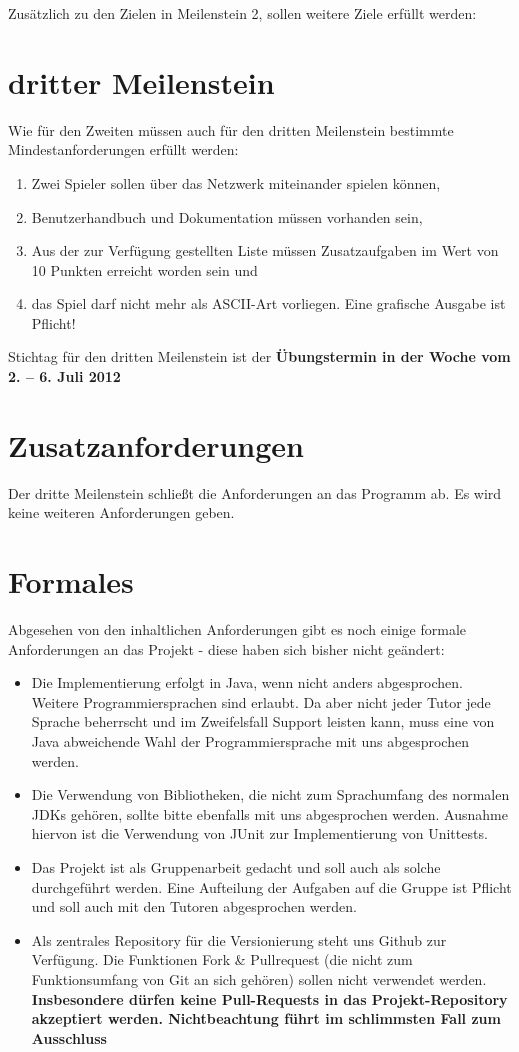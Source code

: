\documentclass{programmierpraktikum}
\subtitle{Bomberman}
\begin{document}
\maketitle
Zusätzlich zu den Zielen in Meilenstein 2, sollen weitere Ziele erfüllt werden:
%
\section{dritter Meilenstein}
Wie für den Zweiten müssen auch für den dritten Meilenstein bestimmte Mindestanforderungen erfüllt werden:
\begin{enumerate}
  \item Zwei Spieler sollen über das Netzwerk miteinander spielen können,
  \item Benutzerhandbuch und Dokumentation müssen vorhanden sein,
  \item Aus der zur Verfügung gestellten Liste müssen Zusatzaufgaben im Wert von 10 Punkten erreicht worden sein und
  \item das Spiel darf nicht mehr als ASCII-Art vorliegen. Eine grafische Ausgabe ist Pflicht!
\end{enumerate}
Stichtag für den dritten Meilenstein ist der \textbf{Übungstermin in der Woche vom 2. -- 6. Juli 2012}
\section{Zusatzanforderungen}
Der dritte Meilenstein schließt die Anforderungen an das Programm ab. Es wird keine weiteren Anforderungen geben.
\section{Formales}
Abgesehen von den inhaltlichen Anforderungen gibt es noch einige formale Anforderungen an das Projekt - diese haben sich bisher nicht geändert:
\begin{itemize}
  \item Die Implementierung erfolgt in Java, wenn nicht anders abgesprochen. Wei\-te\-re Pro\-gram\-mier\-sprachen sind erlaubt. Da aber nicht jeder Tutor jede Sprache beherrscht und im Zweifelsfall Support leisten kann, muss eine von Java abweichende Wahl der Programmiersprache mit uns abgesprochen werden.
  \item Die Verwendung von Bibliotheken, die nicht zum Sprachumfang des normalen JDKs gehören, sollte bitte ebenfalls mit uns abgesprochen werden. Ausnahme hiervon ist die Verwendung von JUnit zur Implementierung von Unittests.
  \item Das Projekt ist als Gruppenarbeit gedacht und soll auch als solche durchgeführt werden. Eine Aufteilung der Aufgaben auf die Gruppe ist Pflicht und soll auch mit den Tutoren abgesprochen werden.
  \item Als zentrales Repository für die Versionierung steht uns Github zur Verfügung. Die Funktionen Fork \& Pullrequest (die nicht zum Funktionsumfang von Git an sich gehören) sollen nicht verwendet werden. \textbf{Insbesondere dürfen keine Pull-Requests in das Projekt-Repository akzeptiert werden. Nichtbeachtung führt im schlimmsten Fall zum Ausschluss}
\end{itemize}
\end{document}
